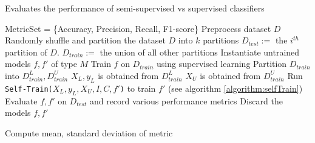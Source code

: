 \documentclass[../main.tex]{subfiles}
\begin{document}
\begin{comment}

Given our unprocessed datasets $\{D_1, D_2, ..., D_n\}$, a classifier $f$ can be evaluated on each dataset using $k$-fold cross validation where $k=10$, similar to previous research. Given the parameters $I, C, U$ such that:
\end{comment}
\begin{comment}
\begin{enumerate}
         \item $D_{train}^L$ only has labelled instances ($|D_{train}^L|=(1-U) \cdot |D_{train}|$)
         \item $D_{train}^U$ only has unlabelled instances ($|D_{train}^U|=U \cdot |D_{train}|$)
\end{enumerate} 
\begin{description}
\item [$I$] is the max number of iterations for the self-training algorithm, $I=$\selfTrainMaxIter
\item [$C$] is the minimum confidence for a prediction on unlabelled data, $C \in \{0.8,0.85,0.9\}$
\item [$U$] is the fraction of instances that will have their labels removed,
$U \in \{0,0.1,0.2,0.3,0.4,0.5,0.6,0.7,0.8\}$ (U=0 indicates that all training data is untouched).  
\end{description}
\end{comment}

\begin{algorithm}
\caption{Evaluates the performance of semi-supervised vs supervised classifiers}
\label{algorithm:evaluation}
\begin{algorithmic}[1]
    \State MetricSet = \{Accuracy, Precision, Recall, F1-score\}
    \State Preprocess dataset $D$
    \State Randomly shuffle and partition the dataset $D$ into $k$ partitions
        \State $D_{test} :=$ the $i^{th}$ partition of $D$.
        \State $D_{train} :=$ the union of all other partitions
        \State Instantiate untrained models $f,f'$ of type $M$
        \State Train $f$ on $D_{train}$ using supervised learning
        \State Partition $D_{train}$ into $D_{train}^L, D_{train}^U$
        \State $X_L, y_L$ is obtained from $D_{train}^L$  
        \State $X_U$ is obtained from $D_{train}^U$
        \State Run \texttt{Self-Train($X_L, y_L, X_U, I, C, f'$)} to train $f'$ (see algorithm \ref{algorithm:selfTrain})
        \State Evaluate $f, f'$ on $D_{test}$ and record various performance metrics
        \State Discard the models $f, f'$
    \EndFor
    
        \State Compute mean, standard deviation of metric
    \EndFor
\EndProcedure
\end{algorithmic}
\end{algorithm}
\end{document}
